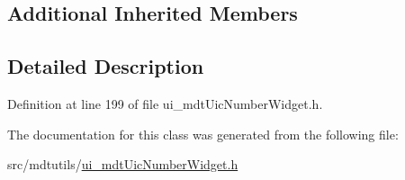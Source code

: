 \subsection*{Additional Inherited Members}


\subsection{Detailed Description}


Definition at line 199 of file ui\-\_\-mdt\-Uic\-Number\-Widget.\-h.



The documentation for this class was generated from the following file\-:\begin{DoxyCompactItemize}
\item 
src/mdtutils/\hyperlink{ui__mdt_uic_number_widget_8h}{ui\-\_\-mdt\-Uic\-Number\-Widget.\-h}\end{DoxyCompactItemize}
